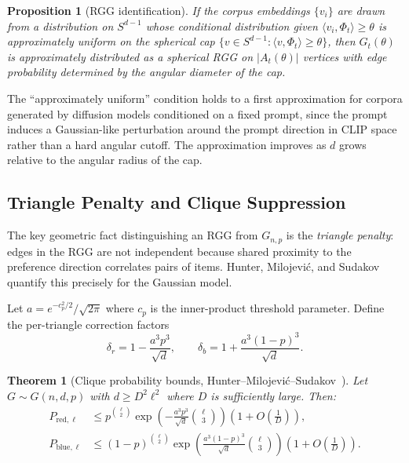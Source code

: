 \documentclass[12pt, a4paper]{article}
\theoremstyle{plain}
\newtheorem{theorem}{Theorem}[section]
\newtheorem{proposition}{Proposition}[section]
\theoremstyle{definition}
\begin{document}
\begin{proposition}[RGG identification]
\label{prop:rgg}
If the corpus embeddings $\{v_i\}$ are drawn from a distribution on
$S^{d-1}$ whose conditional distribution given $\langle v_i, \Phi_t
\rangle \ge \theta$ is approximately uniform on the spherical cap
$\{v \in S^{d-1} : \langle v, \Phi_t \rangle \ge \theta\}$, then
$G_t(\theta)$ is approximately distributed as a spherical RGG on
$|A_t(\theta)|$ vertices with edge probability determined by the
angular diameter of the cap.
\end{proposition}

The ``approximately uniform'' condition holds to a first approximation for
corpora generated by diffusion models conditioned on a fixed prompt, since
the prompt induces a Gaussian-like perturbation around the prompt direction
in CLIP space rather than a hard angular cutoff. The approximation improves
as $d$ grows relative to the angular radius of the cap.

\subsection{Triangle Penalty and Clique Suppression}

The key geometric fact distinguishing an RGG from $G_{n,p}$ is the
\textit{triangle penalty}: edges in the RGG are not independent because
shared proximity to the preference direction correlates pairs of items.
Hunter, Milojević, and Sudakov quantify this precisely for the Gaussian
model.

Let $a = e^{-c_p^2/2}/\sqrt{2\pi}$ where $c_p$ is the inner-product
threshold parameter. Define the per-triangle correction factors
\begin{equation}
  \delta_r = 1 - \frac{a^3 p^3}{\sqrt{d}}, \qquad
  \delta_b = 1 + \frac{a^3(1-p)^3}{\sqrt{d}}.
\end{equation}

\begin{theorem}[Clique probability bounds, Hunter--Milojević--Sudakov~\cite{hunter2026gaussian}]
\label{thm:hms}
Let $G \sim G(n, d, p)$ with $d \ge D^2 \ell^2$ where $D$ is sufficiently
large. Then:
\begin{align}
  P_{\mathrm{red},\ell} &\le p^{\binom{\ell}{2}}
    \exp\!\left(-\frac{a^3 p^3}{\sqrt{d}}\binom{\ell}{3}\right)
    \!\left(1 + O\!\left(\tfrac{1}{D}\right)\right), \label{eq:pred} \\
  P_{\mathrm{blue},\ell} &\le (1-p)^{\binom{\ell}{2}}
    \exp\!\left(\frac{a^3(1-p)^3}{\sqrt{d}}\binom{\ell}{3}\right)
    \!\left(1 + O\!\left(\tfrac{1}{D}\right)\right). \label{eq:pblue}
\end{align}
\end{theorem}
\end{document}
